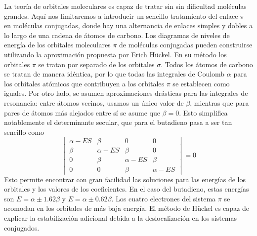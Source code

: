 \documentclass{tufte-handout}
\begin{document}
La teoría de orbitales moleculares es capaz de tratar sin 
sin dificultad moléculas grandes. Aquí nos limitaremos 
a introducir un sencillo tratamiento del enlace $\pi$
en moléculas conjugadas, donde hay una alternancia de 
enlaces simples y dobles a lo largo de una cadena de átomos
de carbono. Los diagramas de niveles de energía de los 
orbitales moleculares $\pi$ de moléculas conjugadas 
pueden construirse utilizando la aproximación propuesta 
por Erich Hückel. 
En su método los orbitales $\pi$
se tratan por separado de los orbitales $\sigma$. Todos 
los átomos de carbono se tratan de manera idéntica, por 
lo que todas las integrales de Coulomb $\alpha$ para los 
orbitales atómicos que contribuyen a los orbitales $\pi$ 
se establecen como iguales. Por otro lado, se asumen 
aproximaciones drásticas para las integrales de resonancia:
entre átomos vecinos, usamos un único valor de $\beta$, mientras
que para pares de átomos más alejados entre sí se asume que
$\beta=0$. Esto simplifica notablemente el determinante secular,
que para el butadieno pasa a ser tan sencillo como
\begin{equation}
\begin{vmatrix}
	\alpha-ES &  \beta  & 0 & 0 \\ 
	\beta  & \alpha-ES &  \beta  & 0 \\ 
	0 & \beta  &  \alpha-ES &  \beta  \\ 
	0 & 0 & \beta  & \alpha-ES  
\end{vmatrix}= 0
\end{equation}
Esto permite encontrar con gran facilidad las soluciones
para las energías de los orbitales y los valores de los
coeficientes. En el caso del butadieno, estas energías son
$E=\alpha\pm 1.62\beta$ y $E=\alpha\pm 0.62\beta$. Los
cuatro electrones del sistema $\pi$ se acomodan en los 
orbitales de más baja energía. El método de Hückel es
capaz de explicar la estabilización adicional debida a la
deslocalización en los sistemas conjugados.

%
%
%

\end{document}
